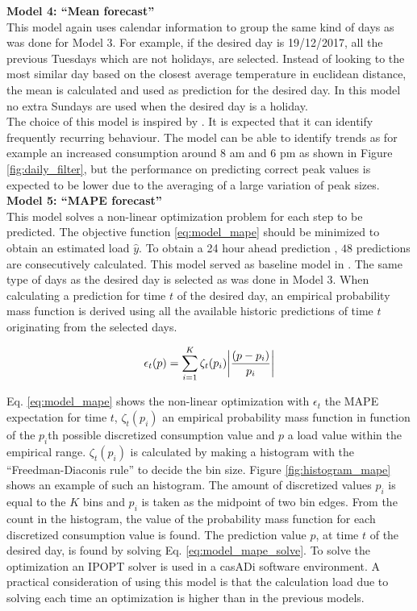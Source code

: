   
 \textbf{Model 4: ``Mean forecast''}\\
 This model again uses calendar information to group the same kind of days as was done for Model 3. For example, if the desired day is 19/12/2017, all the previous Tuesdays which are not holidays, are selected. Instead of looking to the most similar day based on the closest average temperature in euclidean distance, the mean is calculated and used as prediction for the desired day. In this model no extra Sundays are used when the desired day is a holiday.\\
The choice of this model is inspired by \cite{Kong2019}. It is expected that it can identify frequently recurring behaviour. The model can be able to identify trends as for example an increased consumption around $ 8 $ am and $ 6 $ pm as shown in Figure \ref{fig:daily_filter}, but the performance on predicting correct peak values is expected to be lower due to the averaging of a large variation of peak sizes.\\
 
 \textbf{Model 5: ``MAPE forecast'' }\\
 This model solves a non-linear optimization problem for each step to be predicted. The objective function \ref{eq:model_mape} should be minimized to obtain an estimated load $ \hat{y} $. To obtain a 24 hour ahead prediction , $ 48  $ predictions are consecutively calculated. This model served as baseline model in \cite{Kong2019}. The same type of days as the desired day is selected as was done in Model 3. When calculating a prediction for time $ t $ of the desired day, an empirical probability mass function is derived using all the available historic predictions of time $ t $ originating from the selected days.
 
 \begin{equation}\label{eq:model_mape} 	
 	\epsilon_{t}(p) = \sum_{i=1}^K \zeta_{t}(p_i)\abs{\frac{(p-p_{i})}{p_{i}}}
 \end{equation}

Eq. \ref{eq:model_mape} shows the non-linear optimization with $ \epsilon_{t} $ the MAPE expectation for time $ t $, $\zeta_{t}(p_i)$ an empirical probability mass function in function of the $ p_i $th possible discretized consumption value and $ p $ a load value within the empirical range. $ \zeta_{t}(p_i) $ is calculated by making a histogram with the ``Freedman-Diaconis rule'' to decide the bin size. Figure \ref{fig:histogram_mape} shows an example of such an histogram. The amount of discretized values $ p_i $ is equal to the $ K $ bins and $ p_i $ is taken as the midpoint of two bin edges. From the count in the histogram, the value of the probability mass function for each discretized consumption value is found. The prediction value $ p $, at time $ t $ of the desired day, is found by solving Eq. \ref{eq:model_mape_solve}. To solve the optimization an IPOPT solver is used in a casADi software environment. A practical consideration of using this model is that the calculation load due to solving each time an optimization is higher than in the previous models.

